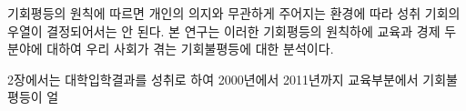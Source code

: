 기회평등의 원칙에 따르면 개인의 의지와 무관하게 주어지는 환경에 따라 성취 기회의 우열이 결정되어서는 안 된다. 본 연구는 이러한 기회평등의 원칙하에 교육과 경제 두 분야에 대하여 우리 사회가 겪는 기회불평등에 대한 분석이다. 

2장에서는 대학입학결과를 성취로 하여 2000년에서 2011년까지 교육부분에서 기회불평등이 얼
